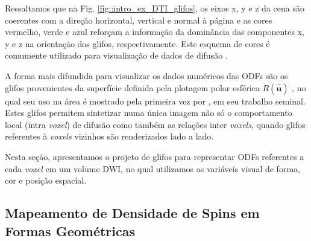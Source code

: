 \documentclass[
    12pt,                %
    oneside,            %
    a4paper,            %
    english,            %
    french,                %
    spanish,            %
    brazil                %
    ]{abntex2}
\begin{document}
Ressaltamos que na Fig. \ref{fig::intro_ex_DTI_glifos}, os eixos x, y e z da cena são coerentes com a direção horizontal, vertical e normal à página e as cores vermelho, verde e azul reforçam a informação da dominância das componentes x, y e z na orientação dos glifos, respectivamente. Este esquema de cores é comumente utilizado para visualização de dados de difusão \cite{DTI_Handbook}.


A forma mais difundida para visualizar os dados numéricos das ODFs são os glifos provenientes da superfície definida pela plotagem polar esférica $R(\mathbf{\hat{u}})$ \cite{descoteaux2015, daducci2014, TuchQBall2004}, no qual seu uso na área é mostrado pela primeira vez por , em seu trabalho seminal. Estes glifos permitem sintetizar numa única imagem não só o comportamento local (intra \textit{voxel}) de difusão como também as relações inter \textit{voxels}, quando glifos referentes à \textit{voxels} vizinhos são renderizados lado a lado.


Nesta seção, apresentamos o projeto de glifos para representar ODFs referentes a cada \textit{voxel} em um volume DWI, no qual utilizamos as variáveis visual de forma, cor e posição espacial.

\subsection{Mapeamento de Densidade de Spins em Formas Geométricas}
\label{sec::glifos_odf}

\end{document}
